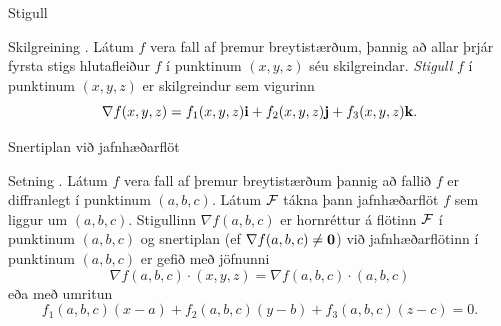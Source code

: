 \begin{frame}{Stigull} 

\begin {block}{Skilgreining \kaflanr.}
 Látum $f$ vera fall af þremur
breytistærðum, þannig að allar þrjár fyrsta stigs hlutafleiður $f$ í
punktinum $(x,y,z)$ séu skilgreindar.  {\em Stigull} $f$ í punktinum
$(x,y,z)$ er skilgreindur sem vigurinn
$$\nabla f(x,y,z)=f_1(x,y,z)\mbox{${\bf i}$}+f_2(x,y,z)\mbox{${\bf j}$}+f_3(x,y,z)\mbox{${\bf k}$}.$$

\end{block}

\end{frame}

\begin{frame}{Snertiplan við jafnhæðarflöt} 

\begin {block}{Setning \kaflanr.}
 Látum $f$ vera fall af þremur
breytistærðum þannig að fallið $f$ er diffranlegt í punktinum $(a,b,c)$.  Látum $\cal F$ tákna þann jafnhæðarflöt $f$ sem liggur um $(a,b,c)$.  Stigullinn $\nabla f(a,b,c)$ er hornréttur á flötinn $\cal F$ í punktinum $(a,b,c)$ og snertiplan (ef $\nabla f(a,b,c)\neq\mbox{${\bf 0}$}$) 
við jafnhæðarflötinn í punktinum $(a,b,c)$ er gefið með jöfnunni 
$$\nabla f(a,b,c)\cdot(x,y,z)=\nabla f(a,b,c)\cdot(a,b,c)$$
eða með umritun
$$f_1(a,b,c)(x-a)+f_2(a,b,c)(y-b)+f_3(a,b,c)(z-c)=0.$$
\end{block}

\end{frame}




